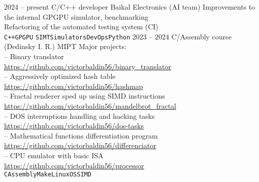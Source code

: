 \documentclass[9pt]{developercv} %
\begin{document}
\begin{entrylist}
        \entry
                {2024 -- present}
                {C/C++ developer}
                {Baikal Electronics (AI team)}
                {Improvements to the internal GPGPU simulator, benchmarking\\
                 Refactoring of the automated testing system (CI)\\
                  \texttt{C++}\slashsep\texttt{GPGPU}
                  \slashsep\texttt{SIMT}\slashsep\texttt{Simulators}\slashsep\texttt{DevOps}\slashsep\texttt{Python}}
        \entry
                {2023 -- 2024}
                {C/Assembly course (Dedinsky I. R.)}
                {MIPT}
                {Major projects:\\
                 -- Binary translator\\
                 \url{https://github.com/victorbaldin56/binary_translator}\\
                 -- Aggressively optimized hash table\\
                 \url{https://github.com/victorbaldin56/hashmap}\\
                 -- Fractal renderer sped up using SIMD instructions\\
                 \url{https://github.com/victorbaldin56/mandelbrot_fractal}\\
                 -- DOS interruptions handling and hacking tasks\\
                 \url{https://github.com/victorbaldin56/dos-tasks}\\
                 -- Mathematical functions differentiation program\\
                 \url{https://github.com/victorbaldin56/differenciator}\\
                 -- CPU emulator with basic ISA\\
                 \url{https://github.com/victorbaldin56/processor}\\
                 \texttt{C}\slashsep\texttt{Assembly}\slashsep\texttt{Make}\slashsep\texttt{Linux}\slashsep\texttt{OS}\slashsep\texttt{SIMD}}

\end{entrylist}
\end{document}
